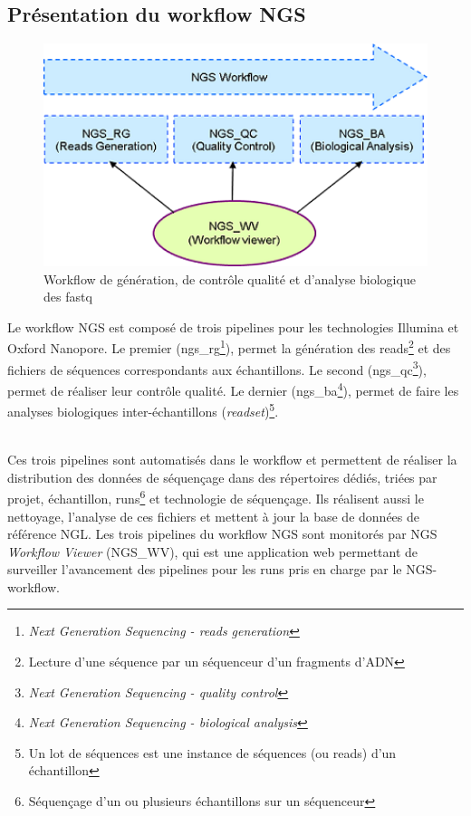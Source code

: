 \subsection{Présentation du workflow NGS}
\begin{minipage}{0.45\textwidth}
	\begin{figure}[H]
		\centering
		\includegraphics[width=1\textwidth]{img/Workflow.png}
		\caption{\footnotesize{Workflow de génération, de contrôle qualité et d’analyse biologique des fastq}}
		\label{worflow-genoscope}
	\end{figure}
\end{minipage}
\hfill
\begin{minipage}{0.45\textwidth}
	Le workflow NGS est composé de trois pipelines pour les technologies Illumina et Oxford Nanopore. Le premier (ngs\_rg\footnote{\emph{Next Generation Sequencing - reads generation}}), permet la génération des reads\footnote{Lecture d'une séquence par un séquenceur d'un fragments d'ADN} et des fichiers de séquences correspondants aux échantillons. Le second (ngs\_qc\footnote{\emph{Next Generation Sequencing - quality control}}), permet de réaliser leur contrôle qualité. Le dernier (ngs\_ba\footnote{\emph{Next Generation Sequencing - biological analysis}}), permet de faire les analyses biologiques inter-échantillons (\emph{readset})\footnote{Un lot de séquences est une instance de séquences (ou reads) d'un échantillon}. 
\end{minipage}\\[0.1cm]

Ces trois pipelines sont automatisés dans le workflow et permettent de réaliser la distribution des données de séquençage dans des répertoires dédiés, triées par projet, échantillon, runs\footnote{Séquençage d'un ou plusieurs échantillons sur un séquenceur} et technologie de séquençage. Ils réalisent aussi le nettoyage, l'analyse de ces fichiers et mettent à jour la base de données de référence NGL. Les trois pipelines du workflow NGS sont monitorés par NGS \emph{Workflow Viewer} (NGS\_WV), qui est une application web permettant de surveiller l'avancement des pipelines pour les runs pris en charge par le NGS-workflow.

